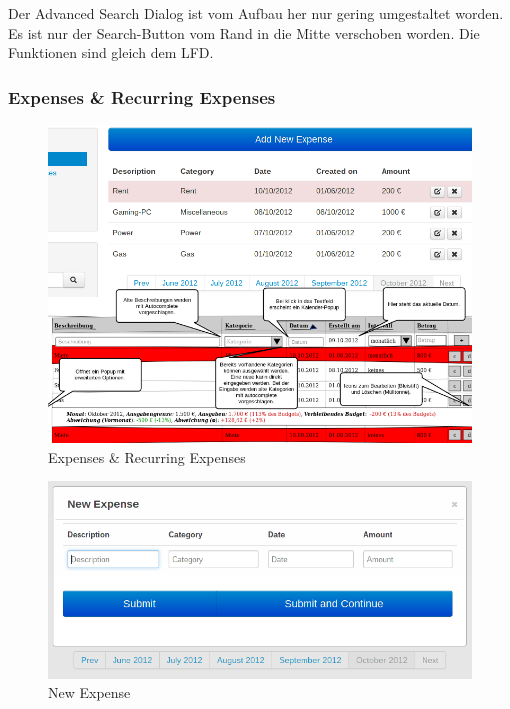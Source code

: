 \documentclass[a4paper,10pt]{article}
\begin{document}
Der Advanced Search Dialog ist vom Aufbau her nur gering umgestaltet worden. Es ist nur der Search-Button vom Rand in die
Mitte verschoben worden. Die Funktionen sind gleich dem LFD.

\clearpage
\subsubsection{Expenses \& Recurring Expenses}

\begin{figure}
\centering
\includegraphics[width=\textwidth]{expenses}
\caption{Expenses \& Recurring Expenses} \label{fig:expenses}
\end{figure}

\begin{figure}
\centering
\includegraphics[width=\textwidth]{expenses-new-ip}
\caption{New Expense} \label{fig:expenses-new}
\end{figure}
\end{document}
